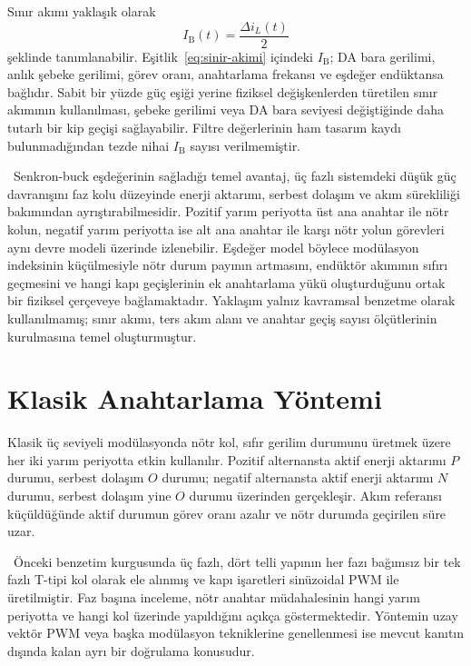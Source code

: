 Sınır akımı yaklaşık olarak
\begin{equation}
  I_{\mathrm{B}}(t)=\frac{\Delta i_L(t)}{2}
  \label{eq:sinir-akimi}
\end{equation}
şeklinde tanımlanabilir. Eşitlik~\eqref{eq:sinir-akimi} içindeki $I_{\mathrm{B}}$; DA bara gerilimi, anlık şebeke gerilimi, görev oranı, anahtarlama frekansı ve eşdeğer endüktansa bağlıdır. Sabit bir yüzde güç eşiği yerine fiziksel değişkenlerden türetilen sınır akımının kullanılması, şebeke gerilimi veya DA bara seviyesi değiştiğinde daha tutarlı bir kip geçişi sağlayabilir. Filtre değerlerinin ham tasarım kaydı bulunmadığından tezde nihai $I_{\mathrm{B}}$ sayısı verilmemiştir.

\eskitezetiketi\ Senkron-buck eşdeğerinin sağladığı temel avantaj, üç fazlı sistemdeki düşük güç davranışını faz kolu düzeyinde enerji aktarımı, serbest dolaşım ve akım sürekliliği bakımından ayrıştırabilmesidir. Pozitif yarım periyotta üst ana anahtar ile nötr kolun, negatif yarım periyotta ise alt ana anahtar ile karşı nötr yolun görevleri aynı devre modeli üzerinde izlenebilir. Eşdeğer model böylece modülasyon indeksinin küçülmesiyle nötr durum payının artmasını, endüktör akımının sıfırı geçmesini ve hangi kapı geçişlerinin ek anahtarlama yükü oluşturduğunu ortak bir fiziksel çerçeveye bağlamaktadır. Yaklaşım yalnız kavramsal benzetme olarak kullanılmamış; sınır akımı, ters akım alanı ve anahtar geçiş sayısı ölçütlerinin kurulmasına temel oluşturmuştur.

\section{Klasik Anahtarlama Yöntemi}

Klasik üç seviyeli modülasyonda nötr kol, sıfır gerilim durumunu üretmek üzere her iki yarım periyotta etkin kullanılır. Pozitif alternansta aktif enerji aktarımı $P$ durumu, serbest dolaşım $O$ durumu; negatif alternansta aktif enerji aktarımı $N$ durumu, serbest dolaşım yine $O$ durumu üzerinden gerçekleşir. Akım referansı küçüldüğünde aktif durumun görev oranı azalır ve nötr durumda geçirilen süre uzar.

\eskitezetiketi\ Önceki benzetim kurgusunda üç fazlı, dört telli yapının her fazı bağımsız bir tek fazlı T-tipi kol olarak ele alınmış ve kapı işaretleri sinüzoidal PWM ile üretilmiştir. Faz başına inceleme, nötr anahtar müdahalesinin hangi yarım periyotta ve hangi kol üzerinde yapıldığını açıkça göstermektedir. Yöntemin uzay vektör PWM veya başka modülasyon tekniklerine genellenmesi ise mevcut kanıtın dışında kalan ayrı bir doğrulama konusudur.

